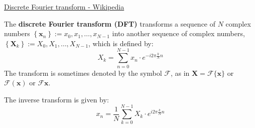 
\href{https://en.wikipedia.org/wiki/Discrete_Fourier_transform}{Discrete Fourier transform - Wikipedia}

\begin{definition}
The \textbf{discrete Fourier transform (DFT)} transforms a sequence of $N$ complex numbers $\left\{\mathbf{x}_n\right\}:=x_0, x_1, \ldots, x_{N-1}$ into another sequence of complex numbers, $\left\{\mathbf{X}_k\right\}:=X_0, X_1, \ldots, X_{N-1}$, which is defined by:
\begin{equation}
    X_k=\sum_{n=0}^{N-1} x_n \cdot e^{-i 2 \pi \frac{k}{N} n}
\end{equation}
The transform is sometimes denoted by the symbol $\mathcal{F}$, as in $\mathbf{X}=\mathcal{F}\{\mathbf{x}\}$ or $\mathcal{F}(\mathbf{x})$ or $\mathcal{F} \mathbf{x}$.
\end{definition}

The inverse transform is given by:
\begin{equation}
    x_n=\frac{1}{N} \sum_{k=0}^{N-1} X_k \cdot e^{i 2 \pi \frac{k}{N} n}
\end{equation}


